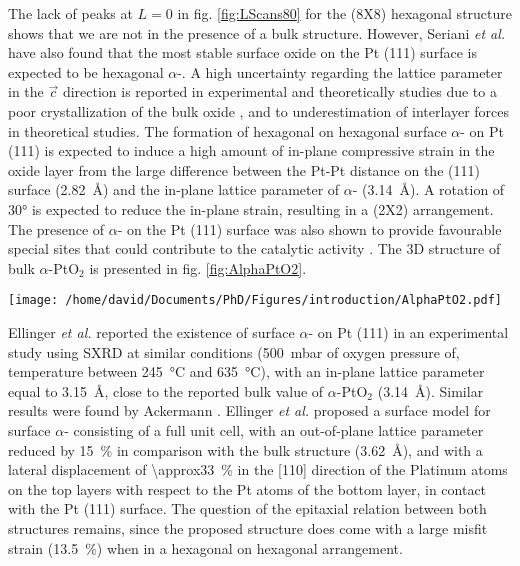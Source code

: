 The lack of peaks at $L=0$ in fig. \ref{fig:LScans80} for the (8X8) hexagonal structure shows that we are not in the presence of a bulk structure.
However, Seriani \textit{et al.} \cite*{Seriani2006} have also found that the most stable surface oxide on the Pt (111) surface is expected to be hexagonal $\alpha$-.
A high uncertainty regarding the lattice parameter in the $\vec{c}$ direction is reported in experimental and theoretically studies due to a poor crystallization of the bulk oxide \parencite{MULLER1968}, and to underestimation of interlayer forces in theoretical studies.
The formation of hexagonal on hexagonal surface $\alpha$- on Pt (111) is expected to induce a high amount of in-plane compressive strain in the oxide layer from the large difference between the Pt-Pt distance on the (111) surface (\qty{2.82}{\angstrom}) and the in-plane lattice parameter of $\alpha$- (\qty{3.14}{\angstrom}).
A rotation of \ang{30} is expected to reduce the in-plane strain, resulting in a (2X2) arrangement.
The presence of $\alpha$- on the Pt (111) surface was also shown to provide favourable special sites that could contribute to the catalytic activity \parencite{LI2005}.
The 3D structure of bulk $\alpha$-PtO$_2$ is presented in fig. \ref{fig:AlphaPtO2}.

\begin{SCfigure}
    \centering
    \texttt{[image: /home/david/Documents/PhD/Figures/introduction/AlphaPtO2.pdf]}
    \caption{
        $\alpha$- bulk unit cell.
        Platinum atoms are situated on the unit cell corners while the two oxygen atoms are at the positions (1/3, 2/3, 1/4) and (2/3, 1/3, 3/4).
    }
    \label{fig:AlphaPtO2}
\end{SCfigure}

Ellinger \textit{et al.} \parencite*{Ellinger2008} reported the existence of surface $\alpha$- on Pt (111) in an experimental study using SXRD at similar conditions (\qty{500}{\milli\bar} of oxygen pressure of, temperature between \qty{245}{\degreeCelsius} and \qty{635}{\degreeCelsius}), with an in-plane lattice parameter equal to \qty{3.15}{\angstrom}, close to the reported bulk value of $\alpha$-PtO$_2$ (\qty{3.14}{\angstrom}).
Similar results were found by Ackermann \parencite*{Ackermann2007}.
Ellinger \textit{et al.} \parencite*{Ellinger2008} proposed a surface model for surface $\alpha$- consisting of a full unit cell, with an out-of-plane lattice parameter reduced by \qty{15}{\percent} in comparison with the bulk structure (\qty{3.62}{\angstrom}), and with a lateral displacement of \qty{\approx33}{\percent} in the [110] direction of the Platinum atoms on the top layers with respect to the Pt atoms of the bottom layer, in contact with the Pt (111) surface.
The question of the epitaxial relation between both structures remains, since the proposed structure does come with a large misfit strain (\qty{13.5}{\percent}) when in a hexagonal on hexagonal arrangement.

